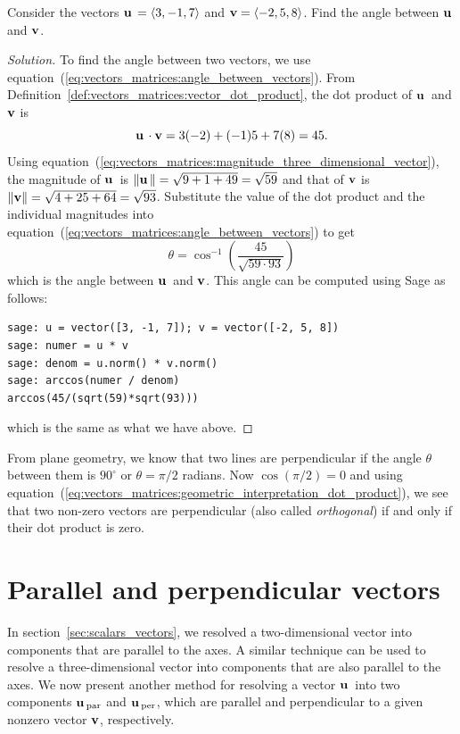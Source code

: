 \begin{example}
Consider the vectors $\operatorname*{\mathbf{u}}{} = \langle 3, -1, 7 \rangle$
and $\operatorname*{\mathbf{v}} = \langle -2, 5, 8 \rangle$. Find the angle
between $\operatorname*{\mathbf{u}}{}$ and $\operatorname*{\mathbf{v}}$.
\end{example}

\begin{proof}[Solution]
To find the angle between two vectors, we use
equation~(\ref{eq:vectors_matrices:angle_between_vectors}). From
Definition~\ref{def:vectors_matrices:vector_dot_product}, the dot
product of $\operatorname*{\mathbf{u}}{}$ and $\operatorname*{\mathbf{v}}$ is
\[
\operatorname*{\mathbf{u}}{} \cdot \operatorname*{\mathbf{v}}
=
3(-2) + (-1)5 + 7(8)
=
45.
\]
Using
equation~(\ref{eq:vectors_matrices:magnitude_three_dimensional_vector}),
the magnitude of $\operatorname*{\mathbf{u}}{}$ is
$\left\Arrowvert \operatorname*{\mathbf{u}}{} \right\Arrowvert = \sqrt{9 + 1 + 49} = \sqrt{59}$ and that
of $\operatorname*{\mathbf{v}}$ is
$\left\Arrowvert \operatorname*{\mathbf{v}} \right\Arrowvert = \sqrt{4 + 25 + 64} = \sqrt{93}$.
Substitute the value of the dot product and the individual magnitudes
into equation~(\ref{eq:vectors_matrices:angle_between_vectors}) to get
\[
\theta
=
\cos^{-1} \left( \frac{45}{\sqrt{59 \cdot 93}} \right)
\]
which is the angle between $\operatorname*{\mathbf{u}}{}$ and $\operatorname*{\mathbf{v}}$. This angle can
be computed using Sage as follows:
%
\begin{lstlisting}
sage: u = vector([3, -1, 7]); v = vector([-2, 5, 8])
sage: numer = u * v
sage: denom = u.norm() * v.norm()
sage: arccos(numer / denom)
arccos(45/(sqrt(59)*sqrt(93)))
\end{lstlisting}
%
which is the same as what we have above.
\end{proof}

From plane geometry, we know that two lines are
perpendicular if the angle $\theta$ between
them is $90^{\circ}$ or $\theta = \pi / 2$ radians. Now $\cos (\pi /
2) = 0$ and using
equation~(\ref{eq:vectors_matrices:geometric_interpretation_dot_product}),
we see that two non-zero vectors are perpendicular (also called
\emph{orthogonal})
if and only if their dot product is zero.



\section{Parallel and perpendicular vectors}

In section~\ref{sec:scalars_vectors}, we resolved a
two-dimensional vector into components that are parallel to the
axes. A similar technique can be used to resolve a three-dimensional
vector into components that are also parallel to the axes. We now
present another method for resolving a vector $\operatorname*{\mathbf{u}}{}$ into two
components $\operatorname*{\mathbf{u}}{}_{\text{par}}$ and $\operatorname*{\mathbf{u}}{}_{\text{per}}$, which are parallel
and perpendicular to a given nonzero vector $\operatorname*{\mathbf{v}}$, respectively.

